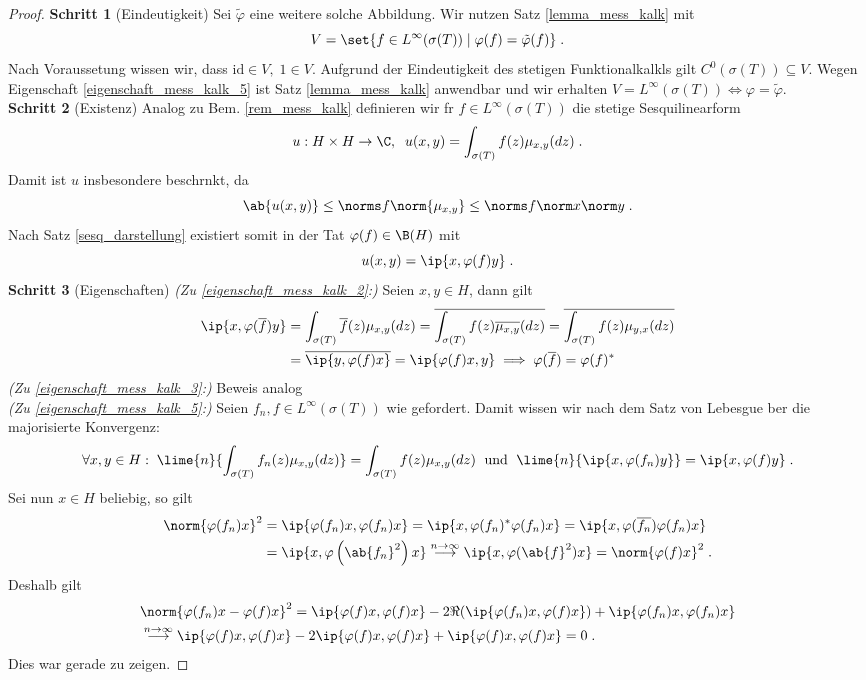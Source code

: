 \begin{proof}
	\textbf{Schritt 1} (Eindeutigkeit) Sei \(\tilde\varphi\) eine weitere solche Abbildung. Wir nutzen Satz \ref{lemma_mess_kalk} mit
	\[V = \set{f\in L^\infty(\sigma(T))\;\vert\; \varphi(f) = \tilde\varphi(f)}\;.\]
	Nach Voraussetung wissen wir, dass \(\text{id} \in V,\; 1 \in V\). Aufgrund der Eindeutigkeit des stetigen Funktionalkalk\us ls gilt \(C^0(\sigma(T)) \subseteq V\). Wegen Eigenschaft \ref{eigenschaft_mess_kalk_5} ist Satz \ref{lemma_mess_kalk} anwendbar und wir erhalten \(V = L^\infty(\sigma(T)) \iff \varphi = \tilde \varphi\).\\
	\textbf{Schritt 2} (Existenz) Analog zu Bem. \ref{rem_mess_kalk} definieren wir f\us r \(f\in L^\infty(\sigma(T))\) die stetige Sesquilinearform
	\[u: H\times H \to \C,\;\; u(x,y) = \int_{\sigma(T)} f(z) \mu_{x,y}(dz)\;.\]
	Damit ist $u$ insbesondere beschr\as nkt, da
	\[\ab{u(x,y)} \leq \norms f \norm{\mu_{x,y}} \leq \norms f \norm x\norm y\;.\]
	Nach Satz \ref{sesq_darstellung} existiert somit in der Tat \(\varphi(f) \in \B(H)\) mit
	\[u(x,y) = \ip{x,\varphi(f)y}\;.\]
	\textbf{Schritt 3} (Eigenschaften) \textit{(Zu \ref{eigenschaft_mess_kalk_2}:)} Seien \(x,y\in H\), dann gilt
	\begin{align*}
		\ip{x,\varphi(\overline f)y} &= \int_{\sigma(T)} \overline{f}(z) \mu_{x,y}(dz)  = \overline{\int_{\sigma(T)} f(z) \overline{\mu_{x,y}}(dz)} = \overline{\int_{\sigma(T)} f(z) \mu_{y,x}(dz)} \\&= \overline{\ip{y, \varphi(f)x}} = \ip{\varphi(f)x,y} \implies \varphi(\overline f) =\varphi(f)^*
	\end{align*}
	\textit{(Zu \ref{eigenschaft_mess_kalk_3}:)} Beweis analog\\
	\textit{(Zu \ref{eigenschaft_mess_kalk_5}:)} Seien \(f_n, f \in L^\infty(\sigma(T))\) wie gefordert. Damit wissen wir nach dem Satz von Lebesgue \us ber die majorisierte Konvergenz:
	\[\forall x, y \in H:\; \lime{n}{\int_{\sigma(T)} f_n(z) \mu_{x,y}(dz)} = \int_{\sigma(T)} f(z) \mu_{x,y}(dz)\;\text{ und }\;\lime{n}{\ip{x,\varphi(f_n)y}} = \ip{x, \varphi(f)y}\;.\]
	Sei nun \(x\in H\) beliebig, so gilt
	\begin{align*}
		\norm{\varphi(f_n)x}^2 &= \ip{\varphi(f_n)x, \varphi(f_n)x} = \ip{x, \varphi(f_n)^*\varphi(f_n)x} = \ip{x, \varphi(\overline{f_n})\varphi(f_n)x} \\
		&= \ip{x,\varphi\left(\ab{f_n}^2\right)x} \overset{n\to\infty}{\longrightarrow} \ip{x, \varphi(\ab{f}^2)x} = \norm{\varphi(f)x}^2\;.
	\end{align*}
	Deshalb gilt
	\begin{align*}
		&\norm{\varphi(f_n)x -\varphi(f)x}^2 = \ip{\varphi(f)x, \varphi(f)x} - 2\Re(\ip{\varphi(f_n)x, \varphi(f)x}) + \ip{\varphi(f_n)x, \varphi(f_n)x}\\
		& \overset{n\to\infty}{\longrightarrow} \ip{\varphi(f)x, \varphi(f)x} -2 \ip{\varphi(f)x, \varphi(f)x} + \ip{\varphi(f)x, \varphi(f)x} = 0\;.
	\end{align*}
	\happybegin
	Dies war gerade zu zeigen.\hfill\happyend
\end{proof}

